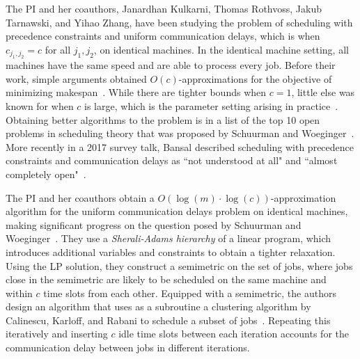 The PI  and her coauthors, Janardhan Kulkarni, Thomas Rothvoss, Jakub Tarnawski, and Yihao Zhang, have been studying the problem 
of scheduling  with 
precedence constraints and uniform communication delays, which is when $c_{j_1,j_2}=c$ for all $j_1,j_2$, on identical machines. 
In the identical machine setting, all machines have the same speed and are able to process every job. 
Before their work, simple arguments obtained $O(c)$-approximations for the objective of minimizing makespan~\cite{GrahamListScheduling1966, GiroudeauKMP08}.
While there are tighter bounds when $c=1$, little else was known for when $c$ is large, which is the parameter setting arising in practice~\cite{MunierKonig, HanenMunier73Apx}.
Obtaining better algorithms to the problem is in a list of the top 10 open problems in scheduling theory that was proposed by Schuurman and Woeginger~\cite{SW99a}.
More recently in a 2017 survey talk, Bansal described scheduling with precedence constraints and communication delays 
as ``not understood at all" and ``almost completely open"~\cite{Bansalmapsp}.

The PI and her coauthors obtain a $O(\log(m) \cdot \log(c))$-approximation algorithm for the uniform communication delays problem on identical machines, 
making significant progress on the question posed by Schuurman and Woeginger~\cite{DKRTZ20}. 
They use a \emph{Sherali-Adams hierarchy} of a linear program, 
which introduces additional variables and constraints to obtain a tighter relaxation.
Using the LP solution, they construct a semimetric on the set of jobs, where jobs close in the semimetric are likely to be scheduled on the same machine
 and within $c$ time slots from each other. 
Equipped with a semimetric, the authors design an algorithm that uses as a subroutine a clustering algorithm by Calinescu, Karloff, and Rabani to schedule a subset of jobs~\cite{DBLP:journals/siamcomp/CalinescuKR04}.
Repeating this iteratively and inserting $c$ idle time slots between each iteration accounts for the communication delay between jobs in different iterations.

